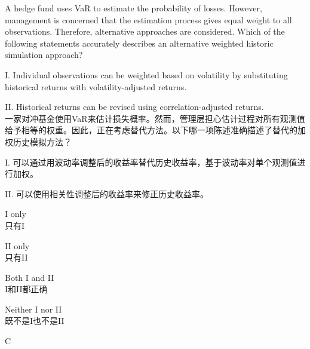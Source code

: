 \documentclass{article}
\newcounter{question} %
\begin{document}
\begin{question}
    A hedge fund uses VaR to estimate the probability of losses. However, management is concerned that the estimation process gives equal weight to all observations. Therefore, alternative approaches are considered. Which of the following statements accurately describes an alternative weighted historic simulation approach? 
    
    I. Individual observations can be weighted based on volatility by substituting historical returns with volatility-adjusted returns.
    
    II. Historical returns can be revised using correlation-adjusted returns.
    \\一家对冲基金使用VaR来估计损失概率。然而，管理层担心估计过程对所有观测值给予相等的权重。因此，正在考虑替代方法。以下哪一项陈述准确描述了替代的加权历史模拟方法？ 

    I. 可以通过用波动率调整后的收益率替代历史收益率，基于波动率对单个观测值进行加权。

    II. 可以使用相关性调整后的收益率来修正历史收益率。
\end{question}

\begin{choices}
    \item I only\\
        只有I
    \item II only\\
        只有II
    \item Both I and II\\
        I和II都正确
    \item Neither I nor II\\
        既不是I也不是II
\end{choices}

\begin{correctanswer}
    C
\end{correctanswer}
\end{document}
